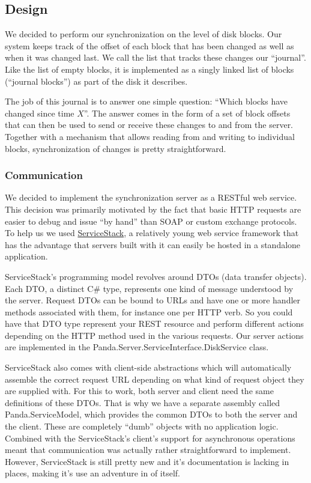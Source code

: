 \documentclass[a4paper,12pt]{article}
\begin{document}
\subsection{Design}
We decided to perform our synchronization on the level of disk blocks.
Our system keeps track of the offset of each block that has been changed as well as when it was changed last.
We call the list that tracks these changes our ``journal''.
Like the list of empty blocks, it is implemented as a singly linked list of blocks (``journal blocks'') as part of the disk it describes.

The job of this journal is to answer one simple question: ``Which blocks have changed since time $X$''.
The answer comes in the form of a set of block offsets that can then be used to send or receive these changes to and from the server. 
Together with a mechanism that allows reading from and writing to individual blocks, synchronization of changes is pretty straightforward.

\subsubsection{Communication}
We decided to implement the synchronization server as a RESTful web service.
This decision was primarily motivated by the fact that basic HTTP requests are easier to debug and issue ``by hand'' than SOAP or custom exchange protocols.
To help us we used \href{http://www.servicestack.net/}{ServiceStack}, a relatively young web service framework that has the advantage that servers built with it can easily be hosted in a standalone application.

ServiceStack's programming model revolves around DTOs (data transfer objects). Each DTO, a distinct C\# type, represents one kind of message understood by the server. 
Request DTOs can be bound to URLs and have one or more handler methods associated with them, for instance one per HTTP verb.
So you could have that DTO type represent your REST resource and perform different actions depending on the HTTP method used in the various requests.
Our server actions are implemented in the Panda.Server.ServiceInterface.DiskService class.

ServiceStack also comes with client-side abstractions which will automatically assemble the correct request URL depending on what kind of request object they are supplied with. 
For this to work, both server and client need the same definitions of these DTOs. 
That is why we have a separate assembly called Panda.ServiceModel, which provides the common DTOs to both the server and the client.
These are completely ``dumb'' objects with no application logic.
Combined with the ServiceStack's client's support for asynchronous operations meant that communication was actually rather straightforward to implement.
However, ServiceStack is still pretty new and it's documentation is lacking in places, making it's use an adventure in of itself.
\end{document}
